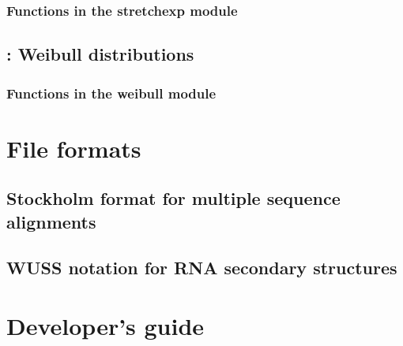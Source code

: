\documentclass[10pt]{book}
\begin{document}
\subsection{Functions in the stretchexp module}


\newpage
\section{: Weibull distributions}

\subsection{Functions in the weibull module}







\newpage
\chapter{File formats}

\section{Stockholm format for multiple sequence alignments}




\newpage
\section{WUSS notation for RNA secondary structures}



\newpage
\chapter{Developer's guide}



\newpage
\newcommand{\bibfont}{\footnotesize}


\end{document}
